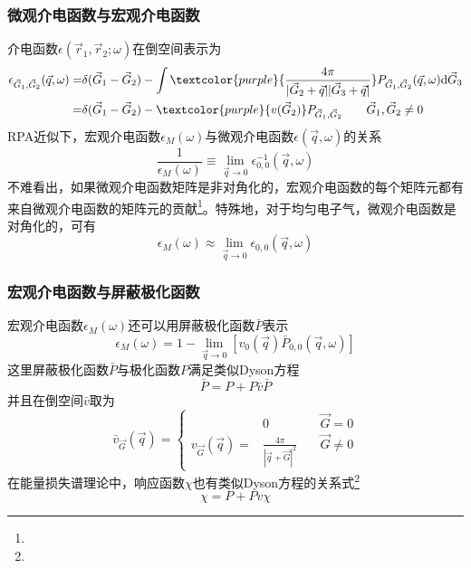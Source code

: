\frame
{
	\frametitle{微观介电函数与宏观介电函数}
	介电函数$\epsilon(\vec r_1,\vec r_2;\omega)$在倒空间表示为
	\begin{displaymath}
		\begin{aligned}
			\epsilon_{\vec G_1,\vec G_2}(\vec q,\omega)=&\delta(\vec G_1-\vec G_2)-\int\textcolor{purple}{\frac{4\pi}{|\vec G_2+\vec q||\vec G_3+\vec q|}}P_{\vec G_1,\vec G_2}(\vec q,\omega)\mathrm{d}\vec G_3\\
			=&\delta(\vec G_1-\vec G_2)-\textcolor{purple}{v(\vec G_2)}P_{\vec G_1,\vec G_2}\qquad \vec G_1,\vec G_2\neq0
		\end{aligned}
	\end{displaymath}
	\textrm{RPA}近似下，宏观介电函数$\epsilon_M(\omega)$与微观介电函数$\epsilon(\vec q,\omega)$的关系
	\begin{displaymath}
		\frac1{\epsilon_M(\omega)}\equiv\mathop{\mathrm{lim}}\limits_{\vec q\rightarrow0}\epsilon_{0,0}^{-1}(\vec q,\omega)
	\end{displaymath}
	不难看出，如果微观介电函数矩阵是非对角化的，宏观介电函数的每个矩阵元都有来自微观介电函数的矩阵元的贡献\footnote{\fontsize{7.0pt}{6.2pt}}。特殊地，对于均匀电子气，微观介电函数是对角化的，可有
	\begin{displaymath}
		\epsilon_M(\omega)\approx\mathop{\mathrm{lim}}\limits_{\vec q\rightarrow0}\epsilon_{0,0}(\vec q,\omega)
	\end{displaymath}
}

\frame
{
	\frametitle{宏观介电函数与屏蔽极化函数}
	宏观介电函数$\epsilon_M(\omega)$还可以用屏蔽极化函数$\bar{P}$表示
	\begin{displaymath}
		\epsilon_M(\omega)=1-\mathop{\mathrm{lim}}\limits_{\vec q\rightarrow0}[v_0(\vec q)\bar{P}_{0,0}(\vec q,\omega)]
	\end{displaymath}
	这里屏蔽极化函数$\bar{P}$与极化函数$P$满足类似\textrm{Dyson}方程
	\begin{displaymath}
		\bar{P}=P+P\bar{v}\bar{P}
	\end{displaymath}
	并且在倒空间$\bar{v}$取为
	\begin{displaymath}
		\bar{v}_{\vec G}(\vec q)=\left\{
			\begin{aligned}
				&0 &\vec G=0\\
				v_{\vec G}(\vec q)=&\frac{4\pi}{|\vec q+\vec G|^2} \quad&\vec G\neq0
			\end{aligned}\right.
	\end{displaymath}
	在能量损失谱理论中，响应函数$\chi$也有类似\textrm{Dyson}方程的关系式\footnote{\fontsize{6.1pt}{4.2pt}\selectfont{习惯上，吸收/发射光谱中响应函数称极化函数,符号用$P(\omega)$;~电子能量损失谱中响应函数称固有极化函数,符号用$\chi(\omega)$.两者都可以用宏观介电函数表示,没有本质区别.}}
\begin{displaymath}
	\chi=P+Pv\chi
\end{displaymath}
}


